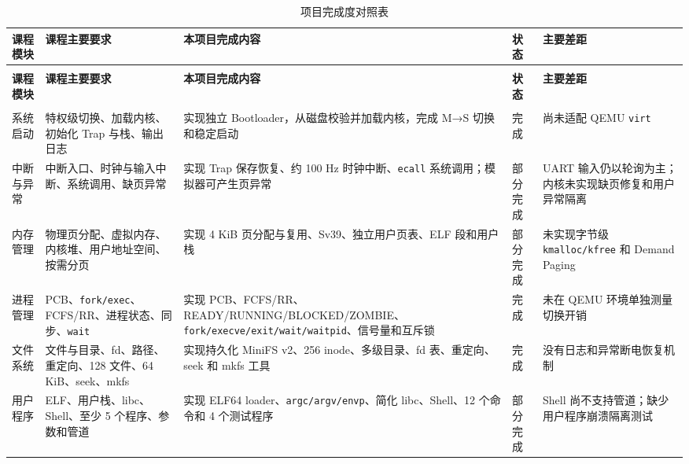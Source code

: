 \documentclass[UTF8,a4paper,12pt,openany,fontset=fandol]{ctexrep}
\renewcommand{\thetable}{\arabic{table}}
\begin{document}
\small
\begin{longtable}{>{\raggedright\arraybackslash}p{}>{\raggedright\arraybackslash}p{}>{\raggedright\arraybackslash}p{}>{\raggedright\arraybackslash}p{}>{\raggedright\arraybackslash}p{}}
\caption{项目完成度对照表}\label{tab:completion}\\
\toprule
\textbf{课程模块} & \textbf{课程主要要求} & \textbf{本项目完成内容} & \textbf{状态} & \textbf{主要差距} \\
\midrule
\endfirsthead
\multicolumn{5}{c}{\small 表 \thetable\ 项目完成度对照表（续）}\\
\toprule
\textbf{课程模块} & \textbf{课程主要要求} & \textbf{本项目完成内容} & \textbf{状态} & \textbf{主要差距} \\
\midrule
\endhead
\midrule
\multicolumn{5}{r}{\small 接下页}\\
\endfoot
\bottomrule
\endlastfoot
系统启动 & 特权级切换、加载内核、初始化 Trap 与栈、输出日志 & 实现独立 Bootloader，从磁盘校验并加载内核，完成 M→S 切换和稳定启动 & 完成 & 尚未适配 QEMU \nolinkurl{virt} \\
中断与异常 & 中断入口、时钟与输入中断、系统调用、缺页异常 & 实现 Trap 保存恢复、约 100 Hz 时钟中断、\nolinkurl{ecall} 系统调用；模拟器可产生页异常 & 部分完成 & UART 输入仍以轮询为主；内核未实现缺页修复和用户异常隔离 \\
内存管理 & 物理页分配、虚拟内存、内核堆、用户地址空间、按需分页 & 实现 4 KiB 页分配与复用、Sv39、独立用户页表、ELF 段和用户栈 & 部分完成 & 未实现字节级 \nolinkurl{kmalloc/kfree} 和 Demand Paging \\
进程管理 & PCB、\nolinkurl{fork/exec}、FCFS/RR、进程状态、同步、\nolinkurl{wait} & 实现 PCB、FCFS/RR、READY/RUNNING/BLOCKED/ZOMBIE、\nolinkurl{fork/execve/exit/wait/waitpid}、信号量和互斥锁 & 完成 & 未在 QEMU 环境单独测量切换开销 \\
文件系统 & 文件与目录、fd、路径、重定向、128 文件、64 KiB、seek、mkfs & 实现持久化 MiniFS v2、256 inode、多级目录、fd 表、重定向、seek 和 mkfs 工具 & 完成 & 没有日志和异常断电恢复机制 \\
用户程序 & ELF、用户栈、libc、Shell、至少 5 个程序、参数和管道 & 实现 ELF64 loader、\nolinkurl{argc/argv/envp}、简化 libc、Shell、12 个命令和 4 个测试程序 & 部分完成 & Shell 尚不支持管道；缺少用户程序崩溃隔离测试 \\
\end{longtable}
\normalsize
\end{document}
